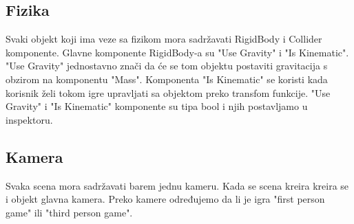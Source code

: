 \subsection{Fizika}
Svaki objekt koji ima veze sa fizikom mora sadržavati RigidBody i Collider komponente. Glavne komponente RigidBody-a su "Use Gravity" i "Is Kinematic".
"Use Gravity" jednostavno znači da će se tom objektu postaviti gravitacija s obzirom na komponentu "Mass". Komponenta "Is Kinematic" se koristi kada korisnik želi tokom igre upravljati sa objektom preko transfom funkcije. "Use Gravity" i "Is Kinematic" komponente su tipa bool i njih postavljamo u inspektoru.

\subsection{Kamera}
Svaka scena mora sadržavati barem jednu kameru. Kada se scena kreira kreira se i objekt glavna kamera. Preko kamere određujemo da li je igra "first person game" ili "third person game".







